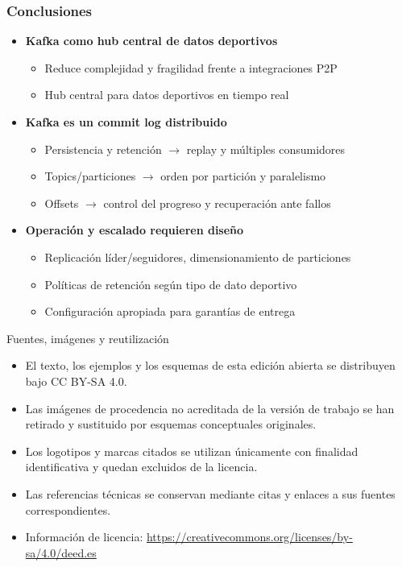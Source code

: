 \documentclass[aspectratio=169]{beamer}
\begin{document}
\begin{frame}\frametitle{Conclusiones}
\begin{itemize}
  \item \textbf{Kafka como hub central de datos deportivos}
  \begin{itemize}
    \item Reduce complejidad y fragilidad frente a integraciones P2P
    \item Hub central para datos deportivos en tiempo real
  \end{itemize}

  \vspace{0.5em}

  \item \textbf{Kafka es un commit log distribuido}
  \begin{itemize}
    \item Persistencia y retención $\rightarrow$ replay y múltiples consumidores
    \item Topics/particiones $\rightarrow$ orden por partición y paralelismo
    \item Offsets $\rightarrow$ control del progreso y recuperación ante fallos
  \end{itemize}

  \vspace{0.5em}

  \item \textbf{Operación y escalado requieren diseño}
  \begin{itemize}
    \item Replicación líder/seguidores, dimensionamiento de particiones
    \item Políticas de retención según tipo de dato deportivo
    \item Configuración apropiada para garantías de entrega
  \end{itemize}
\end{itemize}
\end{frame}



\begin{frame}{Fuentes, imágenes y reutilización}
\small
\begin{itemize}
  \item El texto, los ejemplos y los esquemas de esta edición abierta se distribuyen bajo CC BY-SA 4.0.
  \item Las imágenes de procedencia no acreditada de la versión de trabajo se han retirado y sustituido por esquemas conceptuales originales.
  \item Los logotipos y marcas citados se utilizan únicamente con finalidad identificativa y quedan excluidos de la licencia.
  \item Las referencias técnicas se conservan mediante citas y enlaces a sus fuentes correspondientes.
  \item Información de licencia: \url{https://creativecommons.org/licenses/by-sa/4.0/deed.es}
\end{itemize}
\end{frame}
\end{document}
